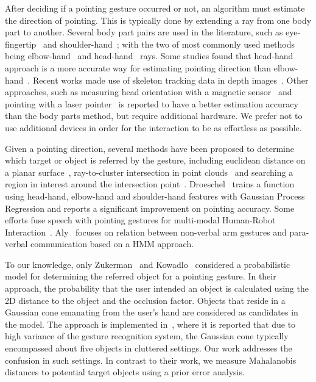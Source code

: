 After deciding if a pointing gesture occurred or not, an algorithm must estimate the direction of pointing. This is typically done by extending a ray from one body part to another. Several body part pairs are used in the literature, such as eye-fingertip~\cite{kehl2004real} and shoulder-hand~\cite{hosoya2004arm}; with the two of most commonly used methods being elbow-hand~\cite{raza2013human, brooks2006working, blodow2011inferring} and head-hand~\cite{bennewitz2008robust, schmidt2008interacting} rays. Some studies found that head-hand approach is a more accurate way for estimating pointing direction than elbow-hand~\cite{quintero2013sepo, droeschel2011towards}. Recent works made use of skeleton tracking data  in depth images~\cite{quintero2013sepo, blodow2011inferring, raza2013human}. Other approaches, such as measuring head orientation with a magnetic sensor~\cite{nickel2003pointing} and pointing with a laser pointer~\cite{cheng2009hand, kemp2008point} is reported to have a better estimation accuracy than the body parts method, but require additional hardware. We prefer not to use additional devices in order for the interaction to be as effortless as possible.

Given a pointing direction, several methods have been proposed to determine which target or object is referred by the gesture, including euclidean distance on a planar surface~\cite{cheng2009hand}, ray-to-cluster intersection in point clouds~\cite{blodow2011inferring, quintero2013sepo} and searching a region in interest around the intersection point~\cite{schmidt2008interacting}. Droeschel~\cite{droeschel2011learning} trains a function using head-hand, elbow-hand and shoulder-hand features with Gaussian Process Regression and reports a significant improvement on pointing accuracy. Some efforts fuse speech with pointing gestures for multi-modal Human-Robot Interaction~\cite{aly2012integrated,kowadlo2010influence}. Aly~\cite{aly2012integrated} focuses on relation between non-verbal arm gestures and para-verbal communication based on a HMM approach.

To our knowledge, only Zukerman~\cite{zukerman2011speaking} and Kowadlo~\cite{kowadlo2010influence} considered a probabilistic model for determining the referred object for a pointing gesture. In their approach, the probability that the user intended an object is calculated using the 2D distance to the object and the occlusion factor. Objects that reside in a Gaussian cone emanating from the user's hand are considered as candidates in the model. The approach is implemented in~\cite{zukerman2011speaking}, where it is reported that due to high variance of the gesture recognition system, the Gaussian cone typically encompassed about five objects in cluttered settings. Our work addresses the confusion in such settings. In contrast to their work, we measure Mahalanobis distances to potential target objects using a prior error analysis.

